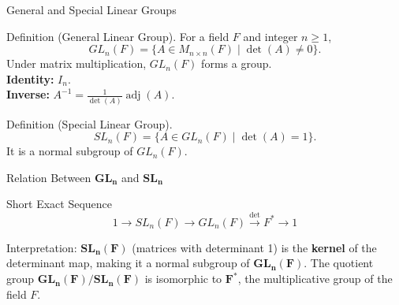 \documentclass[11pt,aspectratio=43,ignorenonframetext,t]{beamer}
\begin{document}
\begin{frame}{General and Special Linear Groups}
\begin{block}{Definition (General Linear Group).}  
For a field \(F\) and integer \(n \ge 1\),
\[
GL_n(F) = \{ A \in M_{n\times n}(F) \mid \det(A) \ne 0 \}.
\]
Under matrix multiplication, \(GL_n(F)\) forms a group.\\
\textbf{Identity:} \(I_n\). \\
\textbf{Inverse:} \(A^{-1} = \frac{1}{\det(A)} \operatorname{adj}(A)\).

\end{block}



\begin{block}{Definition (Special Linear Group).}
\[
SL_n(F) = \{ A \in GL_n(F) \mid \det(A) = 1 \}.
\]
It is a normal subgroup of \(GL_n(F)\).
\end{block}
\end{frame}

\begin{frame}{Relation Between $\mathbf{GL_n}$ and $\mathbf{SL_n}$}
\begin{center}

\vspace{1.5cm} %

\begin{block}{Short Exact Sequence}
\begin{equation*}
1 \to SL_n(F) \to GL_n(F) \xrightarrow{\det} F^* \to 1
\end{equation*}
\end{block}

\end{center}

\alert{Interpretation:} $\mathbf{SL_n(F)}$ (matrices with determinant 1) is the \textbf{kernel} of the determinant map, making it a normal subgroup of $\mathbf{GL_n(F)}$. The quotient group $\mathbf{GL_n(F)} / \mathbf{SL_n(F)}$ is isomorphic to $\mathbf{F^*}$, the multiplicative group of the field $F$.
\end{frame}
\end{document}
